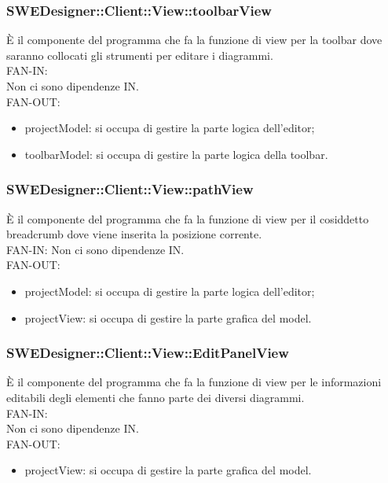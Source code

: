 \documentclass[../PianoDiQualifica.tex]{subfiles}
\begin{document}
		\subsubsection{SWEDesigner::Client::View::toolbarView}
		È il componente del programma che fa la funzione di view per la toolbar dove saranno collocati gli strumenti per editare i diagrammi.\\
			FAN-IN:\\
			Non ci sono dipendenze IN.\\
			FAN-OUT:
			\begin{itemize}
				\item projectModel: si occupa di gestire la parte logica dell'editor;
				\item toolbarModel: si occupa di gestire la parte logica della toolbar.
			\end{itemize}

		\subsubsection{SWEDesigner::Client::View::pathView}
		È il componente del programma che fa la funzione di view per il cosiddetto breadcrumb dove viene inserita la posizione corrente.\\
		FAN-IN:
		Non ci sono dipendenze IN. \\
		FAN-OUT:
		\begin{itemize}
			\item projectModel: si occupa di gestire la parte logica dell'editor;
			\item projectView: si occupa di gestire la parte grafica del model.
		\end{itemize}
	
		\subsubsection{SWEDesigner::Client::View::EditPanelView}
		È il componente del programma che fa la funzione di view per le informazioni editabili degli elementi che fanno parte dei diversi diagrammi.\\
		FAN-IN:\\
		Non ci sono dipendenze IN. \\
		FAN-OUT:
		\begin{itemize}
			\item projectView: si occupa di gestire la parte grafica del model.
		\end{itemize}
	
\end{document}

